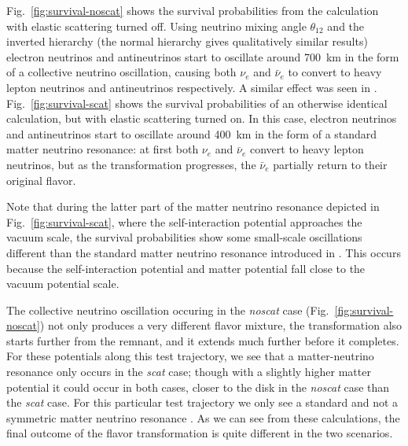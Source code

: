\documentclass[aps,floatfix,prd,superscriptaddress,twocolumn]{revtex4-1}
\begin{document}
Fig.~\ref{fig:survival-noscat} shows the survival probabilities
from the calculation with elastic scattering turned off.
Using neutrino mixing angle $\theta_{12}$ and the inverted hierarchy
(the normal hierarchy gives qualitatively similar results)
electron neutrinos and antineutrinos start to oscillate around
700~km in the form of a collective neutrino oscillation,
causing both $\nu_e$ and $\bar{\nu}_e$ to convert to heavy lepton neutrinos
and antineutrinos respectively.
A similar effect was seen in \cite{fren2017-flavor_bns,tian2017-flavor_bns}.
Fig.~\ref{fig:survival-scat} shows the survival probabilities
of an otherwise identical calculation, but with elastic scattering turned on.
In this case, electron neutrinos and antineutrinos start to oscillate around
400~km in the form of a standard matter neutrino resonance:
at first both $\nu_e$ and $\bar{\nu}_e$ convert to heavy lepton neutrinos,
but as the transformation progresses, the $\bar{\nu}_e$ partially
return to their original flavor.

Note that during the latter part of the matter neutrino resonance
depicted in Fig.~\ref{fig:survival-scat},
where the self-interaction potential approaches the vacuum scale,
the survival probabilities show some small-scale oscillations
different than the standard matter neutrino resonance
introduced in \cite{malk2015-mnr_2}.
This occurs because the self-interaction potential and matter potential
fall close to the vacuum potential scale.

The collective neutrino oscillation occuring in the \emph{noscat} case
(Fig.~\ref{fig:survival-noscat})
not only produces a very different flavor mixture,
the transformation also starts further from the remnant,
and it extends much further before it completes.
For these potentials along this test trajectory,
we see that a matter-neutrino resonance only occurs in the \emph{scat} case;
though with a slightly higher matter potential it could occur in both cases,
closer to the disk in the \emph{noscat} case than the \emph{scat} case.
For this particular test trajectory we only see a standard and not a symmetric
matter neutrino resonance \cite{malk2016-mnr_3,vaan2016-uncovering_mnr}.
As we can see from these calculations, the final outcome of the flavor
transformation is quite different in the two scenarios.
\end{document}
